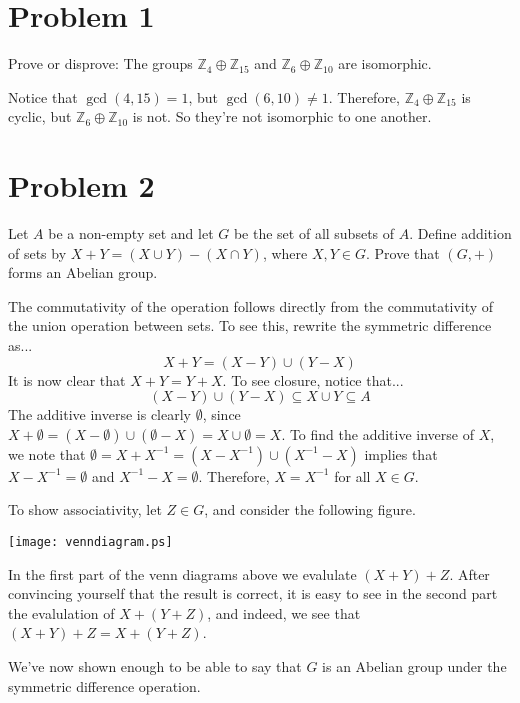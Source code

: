 \documentclass{article}
\begin{document}
\newcommand{\Z}{\mathbb{Z}}
\newcommand{\R}{\mathbb{R}}
\newcommand{\N}{\mathbb{N}}
\newcommand{\lcm}{\mbox{lcm}}

\section*{Problem 1}

Prove or disprove: The groups $\Z_4\oplus\Z_{15}$ and
$\Z_6\oplus\Z_{10}$ are isomorphic.

Notice that $\gcd(4,15)=1$, but $\gcd(6,10)\neq 1$.
Therefore, $\Z_4\oplus\Z_{15}$ is cyclic, but $\Z_6\oplus\Z_{10}$ is not.
So they're not isomorphic to one another.

\section*{Problem 2}

Let $A$ be a non-empty set and let $G$ be the set of all subsets of $A$.
Define addition of sets by $X+Y=(X\cup Y)-(X\cap Y)$, where $X,Y\in G$.
Prove that $(G,+)$ forms an Abelian group.

The commutativity of the operation follows directly
from the commutativity of the union operation between
sets.  To see this, rewrite the symmetric difference as...
\begin{equation*}
X+Y=(X-Y)\cup(Y-X)
\end{equation*}
It is now clear that $X+Y=Y+X$.
To see closure, notice that...
\begin{equation*}
(X-Y)\cup(Y-X)\subseteq X\cup Y\subseteq A
\end{equation*}
The additive inverse is clearly $\emptyset$, since
$X+\emptyset=(X-\emptyset)\cup(\emptyset-X)=X\cup\emptyset=X$.
To find the additive inverse of $X$, we note that
$\emptyset=X+X^{-1}=(X-X^{-1})\cup(X^{-1}-X)$ implies that
$X-X^{-1}=\emptyset$ and $X^{-1}-X=\emptyset$.  
Therefore, $X=X^{-1}$ for all $X\in G$.

To show associativity, let $Z\in G$, and consider the following figure.
\begin{center}
\texttt{[image: venndiagram.ps]}
\end{center}
In the first part of the venn diagrams above we evalulate $(X+Y)+Z$.
After convincing yourself that the result is correct, it is easy
to see in the second part the evalulation of $X+(Y+Z)$,
and indeed, we see that $(X+Y)+Z=X+(Y+Z)$.

We've now shown enough to be able to say that $G$ is an Abelian group
under the symmetric difference operation.
\end{document}
